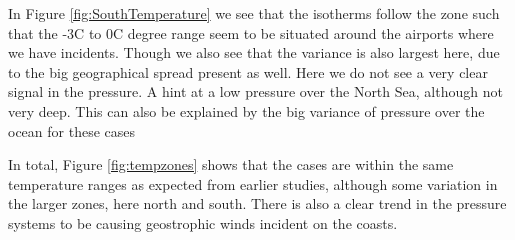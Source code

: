 In Figure \ref{fig:SouthTemperature} we see that the isotherms follow the zone such that the -3C to 0C degree range seem to be situated around the airports where we have incidents. Though we also see that the variance is also largest here, due to the big geographical spread present as well. Here we do not see a very clear signal in the pressure. A hint at a low pressure over the North Sea, although not very deep. This can also be explained by the big variance of pressure over the ocean for these cases 

In total, Figure \ref{fig:tempzones} shows that the cases are within the same temperature ranges as expected from earlier studies, although some variation in the larger zones, here north and south. There is also a clear trend in the pressure systems to be causing geostrophic winds incident on the coasts.

